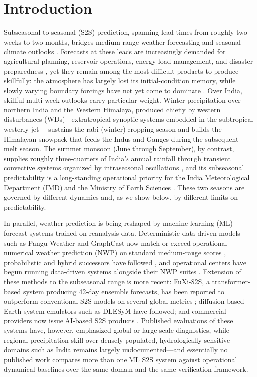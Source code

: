 \documentclass[11pt,a4paper]{article}
\begin{document}
\section{Introduction}\label{sec:intro}

Subseasonal-to-seasonal (S2S) prediction, spanning lead times from roughly two
weeks to two months, bridges medium-range weather forecasting and seasonal
climate outlooks \citep{vitart2017,nas2016}. Forecasts at these leads are
increasingly demanded for agricultural planning, reservoir operations, energy
load management, and disaster preparedness \citep{white2017}, yet they remain
among the most difficult products to produce skillfully: the atmosphere has
largely lost its initial-condition memory, while slowly varying boundary
forcings have not yet come to dominate \citep{mariotti2020}. Over India,
skillful multi-week outlooks carry particular weight. Winter precipitation
over northern India and the Western Himalaya, produced chiefly by western
disturbances (WDs)---extratropical synoptic systems embedded in the
subtropical westerly jet \citep{dimri2015,hunt2018}---sustains the rabi
(winter) cropping season and builds the Himalayan snowpack that feeds the
Indus and Ganges during the subsequent melt season. The summer monsoon (June
through September), by contrast, supplies roughly three-quarters of India's
annual rainfall through transient convective systems organized by
intraseasonal oscillations \citep{zhang2005,wheelerhendon2004}, and its
subseasonal predictability is a long-standing operational priority for the
India Meteorological Department (IMD)
and the Ministry of Earth Sciences \citep{rao2019,pattanaik2019}. These two
seasons are governed by different dynamics and, as we show below, by
different limits on predictability.

In parallel, weather prediction is being reshaped by machine-learning (ML)
forecast systems trained on reanalysis data. Deterministic data-driven models
such as Pangu-Weather and GraphCast now match or exceed operational numerical
weather prediction (NWP) on standard medium-range scores
\citep{pathak2022,bi2023,lam2023,benbouallegue2024,rasp2024}, probabilistic
and hybrid successors have followed \citep{price2025,kochkov2024}, and
operational centers have begun running data-driven systems alongside their
NWP suites \citep{lang2024}. Extension of these methods to the subseasonal range is more
recent: FuXi-S2S, a transformer-based system producing 42-day ensemble
forecasts, has been reported to outperform conventional S2S models on several
global metrics \citep{chen2024}; diffusion-based Earth-system emulators such as
DLESyM \citep{cresswellclay2024} have followed; and commercial providers now
issue AI-based S2S products \citep{spire2026}. Published evaluations of these
systems have, however, emphasized global or large-scale diagnostics, while
regional precipitation skill over densely populated, hydrologically sensitive
domains such as India remains largely undocumented---and essentially no
published work compares more than one ML S2S system against operational
dynamical baselines over the same domain and the same verification framework.
\end{document}
